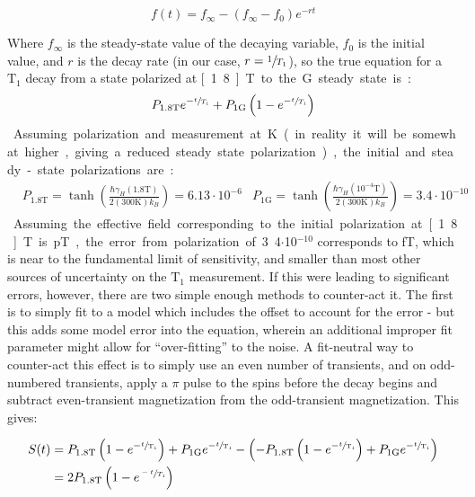 \documentclass[PaulGanssle-Thesis.tex]{subfiles}
\begin{document}
\begin{equation}
\label{eqn:ExponentialDecayGeneral}
f(t) = f_{\infty} - \left(f_{\infty} - f_{0}\right)e^{-rt}
\end{equation}

Where $f_{\infty}$ is the steady-state value of the decaying variable, $f_{0}$ is the initial value, and $r$ is the decay rate (in our case, $r = \sfrac{1}{T_{1}}$), so the true equation for a $\mathrm{T}_{1}$ decay from a state polarized at \unit[1.8]{T} to the \unit[1]{G} steady state is:

\begin{equation}
P_{1.8 \mathrm{T}}e^{-\sfrac{t}{T_{1}}} + P_{1 \mathrm{G}}\left(1-e^{-\sfrac{t}{T_{1}}}\right)
\end{equation}

Assuming polarization and measurement at \unit[300]{K} (in reality it will be somewhat higher, giving a reduced steady state polarization), the initial and steady-state polarizations are:
 
\begin{align}
\label{eqn:InitialPolarization1.8T}
&P_{1.8 \mathrm{T}} = \tanh\left(\frac{\hbar\gamma_{H}(1.8 \mathrm{T})}{2(300 \mathrm{K})k_{B}}\right) = 6.13\cdot 10^{-6} & P_{1 \mathrm{G}} = \tanh\left(\frac{\hbar\gamma_{H}(10^{-4} \mathrm{T})}{2(300 \mathrm{K})k_{B}}\right) = 3.4\cdot 10^{-10} &
\end{align}

Assuming the effective field corresponding to the initial polarization at \unit[1.8]{T} is \unit[600]{pT}, the error from polarization of 3.4$\cdot$10$^{-10}$ corresponds to \unit[30]{fT}, which is near to the fundamental limit of sensitivity, and smaller than most other sources of uncertainty on the $\mathrm{T}_{1}$ measurement. If this were leading to significant errors, however, there are two simple enough methods to counter-act it. The first is to simply fit to a model which includes the offset to account for the error - but this adds some model error into the equation, wherein an additional improper fit parameter might allow for ``over-fitting'' to the noise. A fit-neutral way to counter-act this effect is to simply use an even number of transients, and on odd-numbered transients, apply a $\pi$ pulse to the spins before the decay begins and subtract even-transient magnetization from the odd-transient magnetization. This gives:

\begin{equation}
\label{eqn:CancelDecayEndpointMiscalculation}
\begin{split}
S(t) &= P_{\mathrm{1.8\mathrm{T}}}\left(1 - e^{-\sfrac{t}{\mathrm{T_{1}}}}\right) + P_{1\mathrm{G}}e^{-\sfrac{t}{\mathrm{T_{1}}}} - \left(-P_{\mathrm{1.8T}}\left(1 - e^{-\sfrac{t}{\mathrm{T_{1}}}}\right) + P_{1\mathrm{G}}e^{-\sfrac{t}{\mathrm{T_{1}}}}\right) \\
&= 2P_{\mathrm{1.8T}}\left(1-e^{\sfrac{-t}{T_{1}}}\right)
\end{split}
\end{equation}
\end{document}
